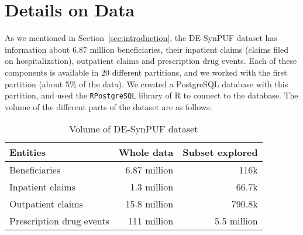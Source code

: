 \section{Details on Data}
\label{sec:data}
As we mentioned in Section~\ref{sec:introduction}, the DE-SynPUF dataset \cite{desynpuf} has information about 6.87 million beneficiaries, their inpatient claims (claims filed on hospitalization), outpatient claims and prescription drug events. Each of these components is available in 20 different partitions, and we worked with the first partition (about 5\% of the data). We created a PostgreSQL \cite{postgresql} database with this partition, and used the \texttt{RPostgreSQL} \cite{rpostgresql} library of R \cite{rcran} to connect to the database. The volume of the different parts of the dataset are as follows:

\begin{table}[ht]
\caption{Volume of DE-SynPUF dataset}
\begin{tabular}{lrr}
\hline
Entities & Whole data & Subset explored\\
\hline
Beneficiaries & 6.87 million & 116k\\
Inpatient claims & 1.3 million & 66.7k\\
Outpatient claims & 15.8 million & 790.8k\\
Prescription drug events & 111 million & 5.5 million\\
\hline
\end{tabular}
\label{tab:desynpuf_data}
\end{table}

